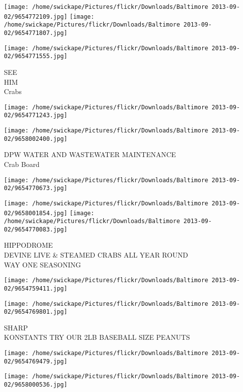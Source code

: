 \documentclass[10pt,letterpaper]{article}
\begin{document}
\texttt{[image: /home/swickape/Pictures/flickr/Downloads/Baltimore 2013-09-02/9654772109.jpg]}
\texttt{[image: /home/swickape/Pictures/flickr/Downloads/Baltimore 2013-09-02/9654771807.jpg]}

\texttt{[image: /home/swickape/Pictures/flickr/Downloads/Baltimore 2013-09-02/9654771555.jpg]}

SEE\\
HIM\\
Crabs
\pagebreak

\texttt{[image: /home/swickape/Pictures/flickr/Downloads/Baltimore 2013-09-02/9654771243.jpg]}

\vspace{0.25in}
\texttt{[image: /home/swickape/Pictures/flickr/Downloads/Baltimore 2013-09-02/9658002400.jpg]}

DPW WATER AND WASTEWATER MAINTENANCE\\
Crab Board
\pagebreak

\texttt{[image: /home/swickape/Pictures/flickr/Downloads/Baltimore 2013-09-02/9654770673.jpg]}

\vspace{0.25in}
\texttt{[image: /home/swickape/Pictures/flickr/Downloads/Baltimore 2013-09-02/9658001854.jpg]}
\texttt{[image: /home/swickape/Pictures/flickr/Downloads/Baltimore 2013-09-02/9654770083.jpg]}

HIPPODROME\\
DEVINE LIVE \& STEAMED CRABS ALL YEAR ROUND\\
WAY ONE SEASONING
\pagebreak

\texttt{[image: /home/swickape/Pictures/flickr/Downloads/Baltimore 2013-09-02/9654759411.jpg]}

\vspace{0.25in}
\texttt{[image: /home/swickape/Pictures/flickr/Downloads/Baltimore 2013-09-02/9654769801.jpg]}

SHARP\\
KONSTANTS TRY OUR 2LB BASEBALL SIZE PEANUTS
\pagebreak

\texttt{[image: /home/swickape/Pictures/flickr/Downloads/Baltimore 2013-09-02/9654769479.jpg]}

\vspace{0.25in}
\texttt{[image: /home/swickape/Pictures/flickr/Downloads/Baltimore 2013-09-02/9658000536.jpg]}
\end{document}
